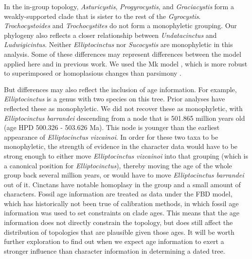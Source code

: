 \documentclass{article}
\begin{document}
In the in-group topology, \textit{Asturicystis}, \textit{Progyrocystis}, and \textit{Graciacystis} form a weakly-supported clade that is sister to the rest of the \textit{Gyrocystis}.
\textit{Trochocystoides} and \textit{Trochocystites} do not form a monophyletic grouping. 
Our phylogeny also reflects a closer relationship between \textit{Undatacinctus} and \textit{Ludwigicintus}. 
Neither \textit{Elliptocinctus} nor \textit{Sucocystis} are monophyletic in this analysis.
Some of these differences may represent differences between the model applied here and in previous work.
We used the Mk model \citep{Lewis2001}, which is more robust to superimposed or homoplasious changes than parsimony \citep{Felsenstein1978, Wright2014}.

But differences may also reflect the inclusion of age information.
For example, \textit{Elliptocinctus} is a genus with two species on this tree. 
Prior analyses have reflected these as monophyletic.
We did not recover these as monophyletic, with \textit{Elliptocinctus barrandei} descending from a node that is 501.865 million years old (age HPD 500.326 - 503.626 Ma).
This node is younger than the earliest appearance of \textit{Elliptocinctus vizcainoi}.
In order for these two taxa to be monophyletic, the strength of evidence in the character data would have to be strong enough to either move \textit{Elliptocinctus vizcainoi} into that grouping (which is a canonical position for \textit{Elliptocinctus}), thereby moving the age of the whole group back several million years, or would have to move \textit{Elliptocinctus barrandei} out of it.
Cinctans have notable homoplasy in the group and a small amount of characters.
Fossil age information are treated as data under the FBD model, which has historically not been true of calibration methods, in which fossil age information was used to set constraints on clade ages.
This means that the age information does not directly constrain the topology, but does still affect the distribution of topologies that are plausible given those ages. 
It will be worth further exploration to find out when we expect age information to exert a stronger influence than character information in determining a dated tree.
\end{document}
